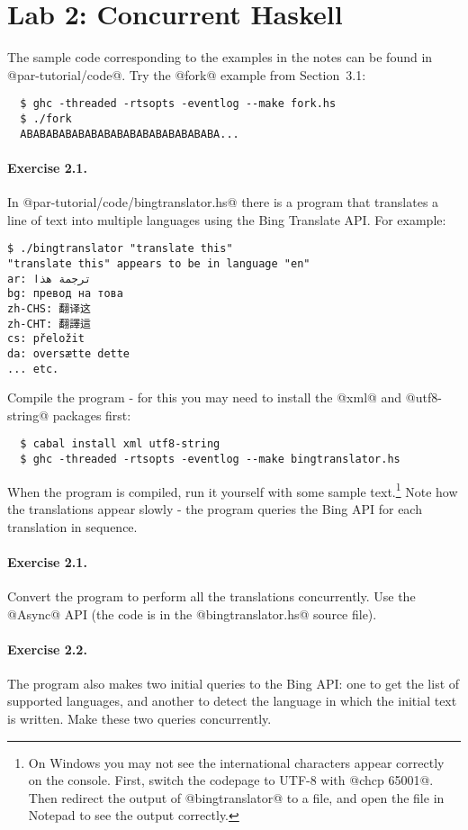 \documentclass[11pt,a4paper]{article}
\newcommand{\Section}[2]{\section{#2}\label{sec:#1}}
\begin{document}
\newpage\Section{conc}{Lab 2: Concurrent Haskell}

The sample code corresponding to the examples in the notes can be
found in @par-tutorial/code@.  Try the @fork@ example from
Section~3.1:

{\small \begin{verbatim}
  $ ghc -threaded -rtsopts -eventlog --make fork.hs
  $ ./fork
  ABABABABABABABABABABABABABABABA...
\end{verbatim}}

\paragraph{Exercise 2.1.} In @par-tutorial/code/bingtranslator.hs@ there is
a program that translates a line of text into multiple languages using
the Bing Translate API.  For example:

{\small \begin{verbatim}
$ ./bingtranslator "translate this"
"translate this" appears to be in language "en"
ar: ترجمة هذا
bg: превод на това
zh-CHS: 翻译这
zh-CHT: 翻譯這
cs: přeložit
da: oversætte dette
... etc.
\end{verbatim}}

\noindent Compile the program - for this you may
need to install the @xml@ and @utf8-string@ packages first:

{\small \begin{verbatim}
  $ cabal install xml utf8-string
  $ ghc -threaded -rtsopts -eventlog --make bingtranslator.hs
\end{verbatim}}

When the program is compiled, run it yourself with some sample
text.\footnote{On Windows you may not see the international characters
  appear correctly on the console.  First, switch the codepage to
  UTF-8 with @chcp 65001@.  Then redirect the output of
  @bingtranslator@ to a file, and open the file in Notepad to see the
  output correctly.} Note how the translations appear slowly - the program queries the Bing API
for each translation in sequence.

\paragraph{Exercise 2.1.} Convert the program to perform all the translations
  concurrently.  Use the @Async@ API (the code is in the
  @bingtranslator.hs@ source file).

\paragraph{Exercise 2.2.} The program also makes two initial queries to
  the Bing API: one to get the list of supported languages, and
  another to detect the language in which the initial text is written.
  Make these two queries concurrently.
\end{document}
